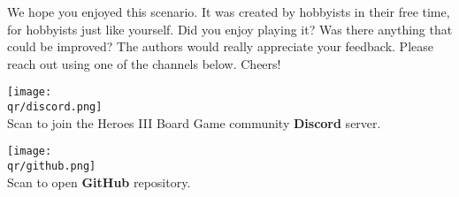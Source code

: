 

\vspace{\baselineskip}
We hope you enjoyed this scenario.  %
It was created by hobbyists in their free time, for hobbyists just like yourself.
Did you enjoy playing it?
Was there anything that could be improved?
The authors would really appreciate your feedback.
Please reach out using one of the channels below.
Cheers!

\begin{multicols}{2}
  \bigbreak
  \centering
  \texttt{[image: \\qr/discord.png]}\\
  Scan to join the Heroes III Board Game community \textbf{Discord} server.\\
  \href{\discordurl}{\discordurl}

  \columnbreak
  \texttt{[image: \\qr/github.png]} \\
  Scan to open \textbf{GitHub} repository. \\
  \href{\repourl}{\repourl}
\end{multicols}

\vfill
\begin{center}
\end{center}
